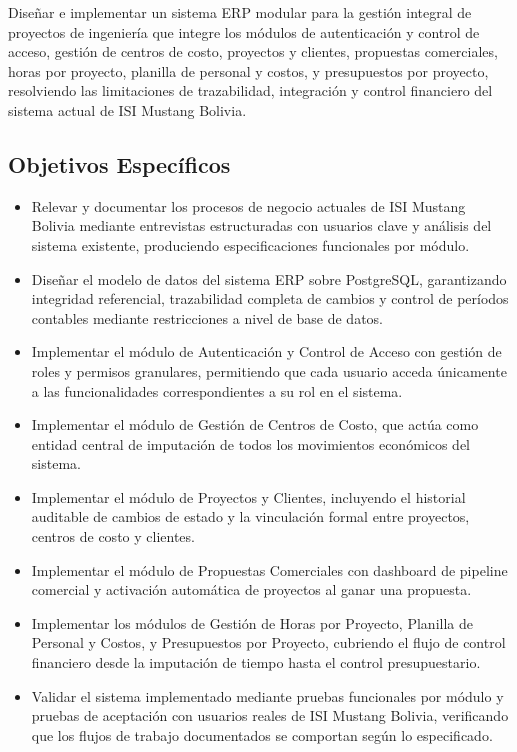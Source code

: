 \documentclass{univalle-perfil}
\begin{document}
Diseñar e implementar un sistema ERP modular para la gestión integral de proyectos de ingeniería que integre los módulos de autenticación y control de acceso, gestión de centros de costo, proyectos y clientes, propuestas comerciales, horas por proyecto, planilla de personal y costos, y presupuestos por proyecto, resolviendo las limitaciones de trazabilidad, integración y control financiero del sistema actual de ISI Mustang Bolivia.

\subsection{Objetivos Específicos}

\begin{itemize}
    \item Relevar y documentar los procesos de negocio actuales de ISI Mustang Bolivia mediante entrevistas estructuradas con usuarios clave y análisis del sistema existente, produciendo especificaciones funcionales por módulo.
    \item Diseñar el modelo de datos del sistema ERP sobre PostgreSQL, garantizando integridad referencial, trazabilidad completa de cambios y control de períodos contables mediante restricciones a nivel de base de datos.
    \item Implementar el módulo de Autenticación y Control de Acceso con gestión de roles y permisos granulares, permitiendo que cada usuario acceda únicamente a las funcionalidades correspondientes a su rol en el sistema.
    \item Implementar el módulo de Gestión de Centros de Costo, que actúa como entidad central de imputación de todos los movimientos económicos del sistema.
    \item Implementar el módulo de Proyectos y Clientes, incluyendo el historial auditable de cambios de estado y la vinculación formal entre proyectos, centros de costo y clientes.
    \item Implementar el módulo de Propuestas Comerciales con dashboard de pipeline comercial y activación automática de proyectos al ganar una propuesta.
    \item Implementar los módulos de Gestión de Horas por Proyecto, Planilla de Personal y Costos, y Presupuestos por Proyecto, cubriendo el flujo de control financiero desde la imputación de tiempo hasta el control presupuestario.
    \item Validar el sistema implementado mediante pruebas funcionales por módulo y pruebas de aceptación con usuarios reales de ISI Mustang Bolivia, verificando que los flujos de trabajo documentados se comportan según lo especificado.
\end{itemize}
\end{document}
